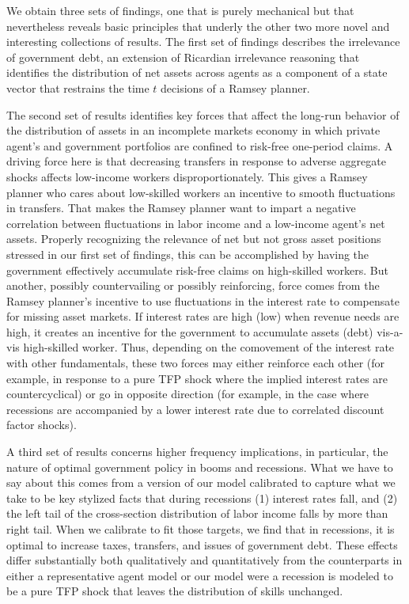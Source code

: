 \documentclass[thmsb,11pt]{article}
\begin{document}
We obtain  three sets of findings, one that is purely mechanical but that nevertheless reveals basic principles that underly the other two more novel and interesting collections of results.
The first set of findings describes the irrelevance of government debt, an extension of Ricardian irrelevance reasoning that
identifies the distribution of net assets across agents as a component of a  state vector that restrains the time $t$ decisions
of a Ramsey planner.

The second set of results identifies key forces  that affect the  long-run behavior of the distribution of assets in
an  incomplete markets economy in which private agent's and  government portfolios are confined to risk-free one-period claims.
A driving force here is  that decreasing transfers in response to adverse aggregate shocks affects low-income workers disproportionately. This gives a Ramsey planner who cares about low-skilled workers an incentive
 to smooth  fluctuations in transfers.  That makes  the Ramsey planner  want to impart a negative correlation between   fluctuations
in  labor income and a low-income  agent's net assets.  Properly recognizing the relevance  of net but not gross asset positions stressed in
our first set of findings, this  can be accomplished by having the  government  effectively accumulate risk-free claims on high-skilled workers.
But another, possibly countervailing or possibly reinforcing,  force  comes from the Ramsey planner's incentive to  use fluctuations in the  interest rate to compensate for missing asset markets. If interest rates are high (low) when revenue needs are high, it creates an incentive  for the government to accumulate assets (debt) vis-a-vis high-skilled worker.
Thus, depending on the comovement of the interest rate with other fundamentals, these two forces  may either reinforce each other (for example, in response to  a pure TFP shock where the implied interest rates are countercyclical) or go in  opposite direction (for example,
in the case where recessions are accompanied by a lower interest rate due to correlated discount factor shocks).

A third set of results concerns higher frequency implications, in particular,  the nature of  optimal government policy in booms and recessions.
What we have to say about this comes from a  version of our model calibrated to capture what we take to be
key  stylized facts  that during recessions  (1) interest rates fall, and (2) the left tail of the cross-section distribution of labor income falls by more than right tail.
 When we calibrate  to fit those targets, we find that in recessions, it is  optimal to increase taxes, transfers, and issues of
 government debt. %
These effects differ substantially both qualitatively and quantitatively from the counterparts in either a representative agent model or our model were a  recession is modeled to be a pure TFP shock that leaves the distribution of skills unchanged.
\end{document}
